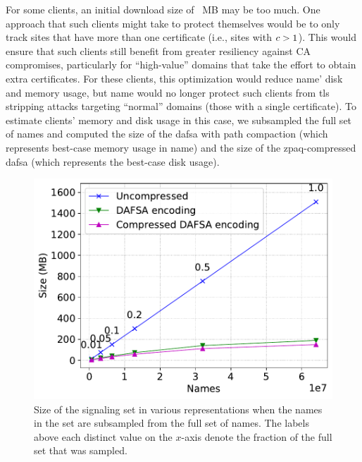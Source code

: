 
For some clients, an initial download size of \fsapczpaqmedsize{}~MB may be too much. One
approach that such clients might take to protect themselves would be to only track
sites that have more than one certificate (i.e., sites with $c > 1$).
This would ensure that such clients still benefit from greater resiliency
against CA compromises, particularly for ``high-value'' domains that take the effort
to obtain extra certificates. 
For these clients, this optimization would reduce \ac{name}' disk and memory usage,
but \ac{name} would no longer protect such clients 
from \ac{tls} stripping attacks targeting
``normal'' domains (those with a single certificate).
To estimate clients' memory and disk usage in this case, we subsampled the full set of names
and computed the size of the \ac{dafsa} with path compaction (which represents
best-case memory usage in \ac{name}) and the size of the zpaq-compressed
\ac{dafsa} (which represents the best-case disk usage).

\begin{figure}[t]
  \centering
  \includegraphics[width=\linewidth]{fig/sample}
  \caption{Size of the signaling set in various representations when 
           the names in the set are subsampled from the full set of names. 
           The labels above each distinct value on the $x$-axis
           denote the fraction of the full set that was sampled.}
  \label{fig:sample}
\end{figure}

